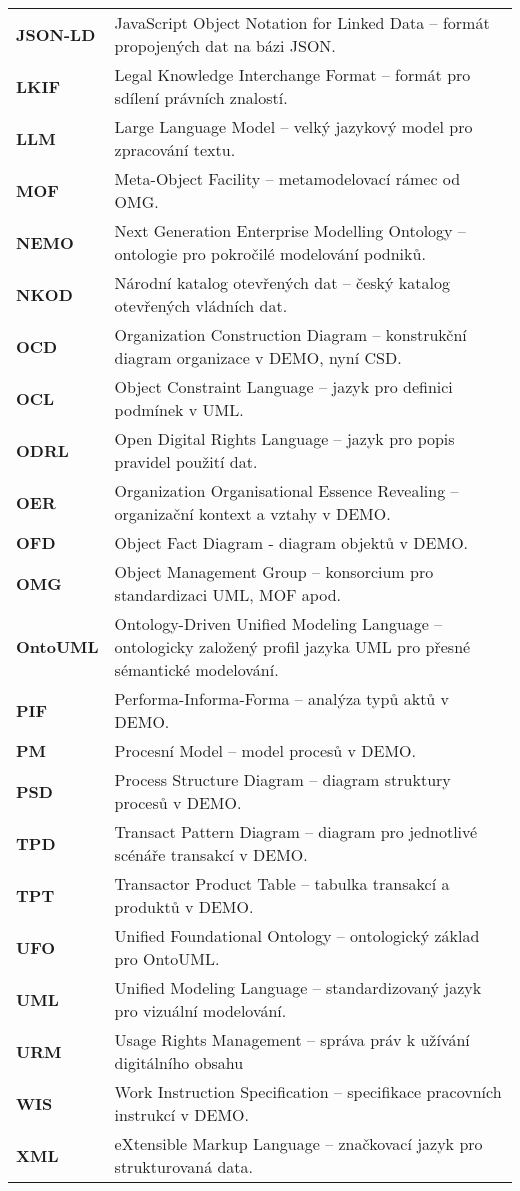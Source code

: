 \documentclass[czech,bachelor,unicode,oneside]{ctufit-thesis}
\begin{document}
\begin{longtable}{p{2.5cm}p{9.5cm}}
\textbf{JSON-LD} & JavaScript Object Notation for Linked Data – formát propojených dat na bázi JSON. \\
\textbf{LKIF} & Legal Knowledge Interchange Format – formát pro sdílení právních znalostí. \\
\textbf{LLM} & Large Language Model – velký jazykový model pro zpracování textu. \\
\textbf{MOF} & Meta-Object Facility – metamodelovací rámec od OMG. \\
\textbf{NEMO} & Next Generation Enterprise Modelling Ontology – ontologie pro pokročilé modelování podniků. \\
\textbf{NKOD} & Národní katalog otevřených dat – český katalog otevřených vládních dat. \\
\textbf{OCD} & Organization Construction Diagram – konstrukční diagram organizace v DEMO, nyní CSD. \\
\textbf{OCL} & Object Constraint Language – jazyk pro definici podmínek v UML. \\
\textbf{ODRL} & Open Digital Rights Language – jazyk pro popis pravidel použití dat. \\
\textbf{OER} & Organization Organisational Essence Revealing – organizační kontext a vztahy v DEMO. \\
\textbf{OFD} & Object Fact Diagram - diagram objektů v DEMO. \\
\textbf{OMG} & Object Management Group – konsorcium pro standardizaci UML, MOF apod. \\
\textbf{OntoUML} & Ontology-Driven Unified Modeling Language – ontologicky založený profil jazyka UML pro přesné sémantické modelování. \\
\textbf{PIF} & Performa-Informa-Forma – analýza typů aktů v DEMO. \\
\textbf{PM} & Procesní Model – model procesů v DEMO. \\
\textbf{PSD} & Process Structure Diagram – diagram struktury procesů v DEMO. \\
\textbf{TPD} & Transact Pattern Diagram – diagram pro jednotlivé scénáře transakcí v DEMO. \\
\textbf{TPT} & Transactor Product Table – tabulka transakcí a produktů v DEMO. \\
\textbf{UFO} & Unified Foundational Ontology – ontologický základ pro OntoUML. \\
\textbf{UML} & Unified Modeling Language – standardizovaný jazyk pro vizuální modelování. \\
\textbf{URM} & Usage Rights Management – správa práv k užívání digitálního obsahu \\
\textbf{WIS} & Work Instruction Specification – specifikace pracovních instrukcí v DEMO. \\
\textbf{XML} & eXtensible Markup Language – značkovací jazyk pro strukturovaná data. \\
\end{longtable}
\end{document}
